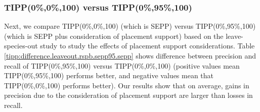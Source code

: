 \subsubsection{TIPP(0\%,0\%,100) versus TIPP(0\%,95\%,100)}
Next, we compare TIPP(0\%,0\%,100) (which is SEPP) versus TIPP(0\%,95\%,100) (which is SEPP plus consideration of placement support) based on the leave-species-out study
to study the effects of placement support considerations.
Table \ref{tipp:difference.leaveout.rspb.sepp95.sepp} shows difference between precision and recall of 
TIPP(0\%,95\%,100) versus TIPP(0\%,0\%,100) (positive values mean TIPP(0\%,95\%,100) performs better, and negative values mean that TIPP(0\%,0\%,100) performs better). 
Our results show that on average, gains in precision due to the consideration of placement support are larger than losses in recall.

